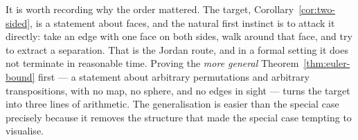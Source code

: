 \begin{remark}
It is worth recording why the order mattered. The target,
Corollary~\ref{cor:two-sided}, is a statement about faces, and the natural
first instinct is to attack it directly: take an edge with one face on both
sides, walk around that face, and try to extract a separation. That is the
Jordan route, and in a formal setting it does not terminate in reasonable
time. Proving the \emph{more general} Theorem~\ref{thm:euler-bound} first
--- a statement about arbitrary permutations and arbitrary transpositions,
with no map, no sphere, and no edges in sight --- turns the target into
three lines of arithmetic. The generalisation is easier than the special
case precisely because it removes the structure that made the special case
tempting to visualise.
\end{remark}
